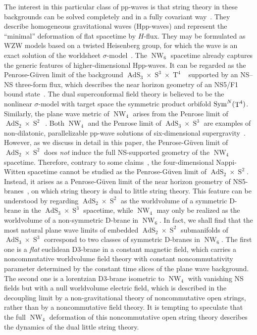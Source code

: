 \documentclass[11pt,a4paper]{article}
\DeclareMathOperator{\AdS}{AdS}
\DeclareMathOperator{\Sphere}{S}
\DeclareMathOperator{\Torus}{T}
\DeclareMathOperator{\NW}{NW}
\let\S\Sphere
\begin{document}
The interest in this particular class of pp-waves is that string
theory in these backgrounds can be solved completely and in a fully
covariant way~\cite{BAKZ1,CFS1,DAK1,FHHP1,KK1,KKL1,RT2}. They describe
homogeneous gravitational waves (Hpp-waves) and represent the
``minimal'' deformation of flat spacetime by $H$-flux. They may be
formulated as WZW models based on a twisted Heisenberg group, for
which the wave is an exact solution of the worldsheet
$\sigma$-model~\cite{KM1,NW1}. The $\NW_6$ spacetime already captures
the generic features of higher-dimensional Hpp-waves. It can be
regarded as the Penrose-G\"uven limit of the background
$\AdS_3\times\S^3\times\Torus^4$~\cite{BFP1,BFHP1} supported by an
NS--NS three-form flux, which describes the near horizon geometry of
an NS5/F1 bound state~\cite{GKS1}. The dual superconformal field
theory is believed to be the nonlinear $\sigma$-model with target
space the symmetric product orbifold ${\rm
  Sym}^N(\Torus^4)$. Similarly, the plane wave metric of $\NW_4$
arises from the Penrose limit of
$\AdS_2\times\S^2$~\cite{BFP1,BFHP1}. Both $\NW_4$ and the Penrose
limit of $\AdS_3\times\S^3$ are examples of non-dilatonic,
parallelizable pp-wave solutions of six-dimensional
supergravity~\cite{SS-J1}. However, as we discuss in detail
in this paper, the Penrose-G\"uven limit of $\AdS_2\times\S^2$ does
{\it not} induce the full NS-supported geometry of the $\NW_4$
spacetime. Therefore, contrary to some claims~\cite{DeKa1,SF1},
the four-dimensional Nappi-Witten spacetime cannot be studied as the
Penrose-G\"uven limit of $\AdS_2\times\S^2$. Instead, it arises as a
Penrose-G\"uven limit of the near horizon geometry of NS5-branes~\cite{GO1}, on
which string theory is dual to little string theory. This feature can be
understood by regarding $\AdS_2\times\S^2$ as the worldvolume of a
symmetric D-brane in the $\AdS_3\times\S^3$ spacetime, while $\NW_4$
may only be realized as the worldvolume of a non-symmetric D-brane in
$\NW_6$. In fact, we shall find that the most natural plane wave
limits of embedded $\AdS_2\times\S^2$ submanifolds of
$\AdS_3\times\S^3$ correspond to two classes of symmetric D-branes in
$\NW_6$. The first one is a {\it flat} euclidean D3-brane in a
constant magnetic field, which carries a noncommutative
worldvolume field theory with constant noncommutativity parameter
determined by the constant time slices of the plane wave
background. The second one is a lorentzian D3-brane isometric to
$\NW_4$ with vanishing NS fields but with a null worldvolume electric
field, which is described in the decoupling limit by a
non-gravitational theory of noncommutative open strings, rather than
by a noncommutative field theory. It is tempting to speculate that the
full $\NW_4$ deformation of this noncommutative open string theory
describes the dynamics of the dual little string theory.
\end{document}
